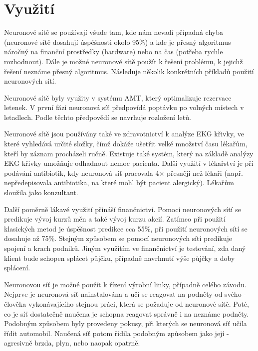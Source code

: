 \documentclass[11pt,twoside,a4paper]{book}
\begin{document}
\section{Využití}
Neuronové sítě se používají všude tam, kde nám nevadí případná chyba (neuronové sítě dosahují úspěšnosti okolo 95\%) a kde je přesný algoritmus náročný na finanční prostředky (hardware) nebo na čas (potřeba rychle rozhodnout). Dále je možné neuronové sítě použít k řešení problému, k jejichž řešení neznáme přesný algoritmus. Následuje několik konkrétních příkladů použití neuronových sítí.

Neuronové sítě byly využity v systému AMT, který optimalizuje rezervace letenek. V první fázi neuronová síť předpovídá poptávku po volných místech v letadlech. Podle těchto předpovědí se navrhuje rozložení letů.

Neuronové sítě jsou používány také ve zdravotnictví k analýze EKG křivky, ve které vyhledává určité složky, čímž dokáže ušetřit velké množství času lékařům, kteří by záznam procházeli ručně. Existuje také systém, který na základě analýzy EKG křivky umožňuje odhadnout nemoc pacienta. Další využití v lékařství je při podávání antibiotik, kdy neuronová síť pracovala 4\begin{math}\times\end{math} přesněji než lékaři (např. nepředepisovala antibiotika, na které mohl být pacient alergický). Lékařům sloužila jako konzultant.

Další poměrně lákavé využití přináší finančnictví. Pomocí neuronových sítí se predikuje vývoj kurzů měn a také vývoj kurzu akcií. Zatímco při použití klasických metod je úspěšnost predikce cca 55\%, při použití neuronových sítí se dosahuje až 75\%. Stejným způsobem se pomocí neuronových sítí predikuje spojení a krach podniků. Jiným využitím ve finančnictví je testování, zda daný klient bude schopen splácet půjčku, případně navrhnutí výše půjčky a doby splácení.

Neuronovou síť je možné použít k řízení výrobní linky, případně celého závodu. Nejprve je neuronová síť nainstalována a učí se reagovat na podněty od svého  - člověka vykonávajícího stejnou práci, která se požaduje od neuronové sítě. Poté, co je síť dostatečně naučena je schopna reagovat správně i na neznáme podněty. Podobným způsobem byly provedeny pokusy, při kterých se neuronová síť učila řídit automobil. Naučená síť potom řídila podobným způsobem jako její  - agresivně brzda, plyn, nebo naopak opatrně.\cite{kacenka}
\end{document}
